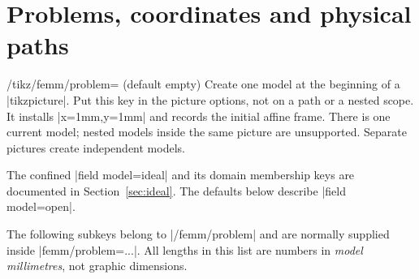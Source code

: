 \section{Problems, coordinates and physical paths}
\label{sec:model}
\begin{key}{/tikz/femm/problem= (default \normalfont empty)}
Create one model at the beginning of a |tikzpicture|. Put this key in the
picture options, not on a path or a nested scope. It installs |x=1mm,y=1mm|
and records the initial affine frame. There is one current model; nested
models inside the same picture are unsupported. Separate pictures create
independent models.
\end{key}

The confined |field model=ideal| and its domain membership keys are documented
in Section~\ref{sec:ideal}. The defaults below describe |field model=open|.

The following subkeys belong to |/femm/problem| and are normally supplied
inside |femm/problem={...}|. All lengths in this list are numbers in
\emph{model millimetres}, not graphic dimensions.

